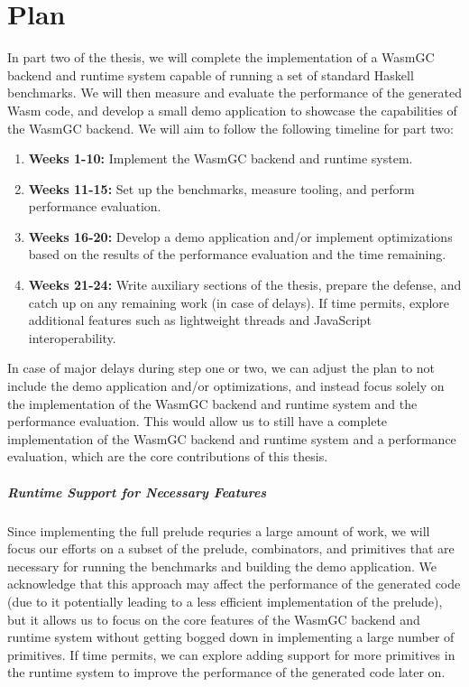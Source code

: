 \chapter{Plan}\label{ch:plan}
In part two of the thesis, we will complete the implementation of a WasmGC backend and runtime system capable of running a set of standard Haskell benchmarks. We will then measure and evaluate the performance of the generated Wasm code, and develop a small demo application to showcase the capabilities of the WasmGC backend. We will aim to follow the following timeline for part two:
\begin{enumerate}
    \item \textbf{Weeks 1-10:} Implement the WasmGC backend and runtime system.
    \item \textbf{Weeks 11-15:} Set up the benchmarks, measure tooling, and perform performance evaluation.
    \item \textbf{Weeks 16-20:} Develop a demo application and/or implement optimizations based on the results of the performance evaluation and the time remaining.
    \item \textbf{Weeks 21-24:} Write auxiliary sections of the thesis, prepare the defense, and catch up on any remaining work (in case of delays). If time permits, explore additional features such as lightweight threads and JavaScript interoperability.
\end{enumerate}

In case of major delays during step one or two, we can adjust the plan to not include the demo application and/or optimizations, and instead focus solely on the implementation of the WasmGC backend and runtime system and the performance evaluation. This would allow us to still have a complete implementation of the WasmGC backend and runtime system and a performance evaluation, which are the core contributions of this thesis.

\paragraph{Runtime Support for Necessary Features} Since implementing the full prelude requries a large amount of work, we will focus our efforts on a subset of the prelude, combinators, and primitives that are necessary for running the benchmarks and building the demo application. We acknowledge that this approach may affect the performance of the generated code (due to it potentially leading to a less efficient implementation of the prelude), but it allows us to focus on the core features of the WasmGC backend and runtime system without getting bogged down in implementing a large number of primitives. If time permits, we can explore adding support for more primitives in the runtime system to improve the performance of the generated code later on.


